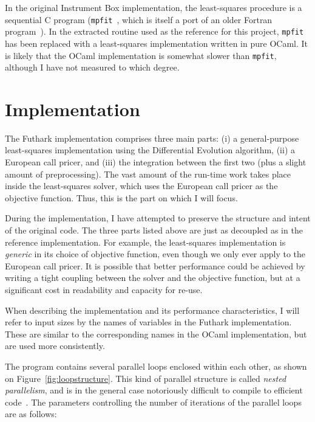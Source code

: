 \documentclass{article}
\begin{document}
In the original Instrument Box implementation, the least-squares
procedure is a sequential C program (\texttt{mpfit}~\cite{0902.2850},
which is itself a port of an older Fortran program~\cite{More1978}).
In the extracted routine used as the reference for this project,
\texttt{mpfit} has been replaced with a least-squares implementation
written in pure OCaml.  It is likely that the OCaml implementation is
somewhat slower than \texttt{mpfit}, although I have not measured to
which degree.

\section{Implementation}
\label{sec:implementation}

The Futhark implementation comprises three main parts: (i) a
general-purpose least-squares implementation using the Differential
Evolution algorithm, (ii) a European call pricer, and (iii) the
integration between the first two (plus a slight amount of
preprocessing).  The vast amount of the run-time work takes place
inside the least-squares solver, which uses the European call pricer
as the objective function.  Thus, this is the part on which I will
focus.

During the implementation, I have attempted to preserve the structure
and intent of the original code.  The three parts listed above are
just as decoupled as in the reference implementation.  For example,
the least-squares implementation is \textit{generic} in its choice of
objective function, even though we only ever apply to the European
call pricer.  It is possible that better performance could be achieved
by writing a tight coupling between the solver and the objective
function, but at a significant cost in readability and capacity for
re-use.

When describing the implementation and its performance
characteristics, I will refer to input sizes by the names of variables
in the Futhark implementation.  These are similar to the corresponding
names in the OCaml implementation, but are used more consistently.

The program contains several parallel loops enclosed within each
other, as shown on Figure~\ref{fig:loopstructure}.  This kind of
parallel structure is called \textit{nested parallelism}, and is in
the general case notoriously difficult to compile to efficient
code~\cite{blelloch1994implementation}.  The parameters controlling
the number of iterations of the parallel loops are as follows:
\end{document}
